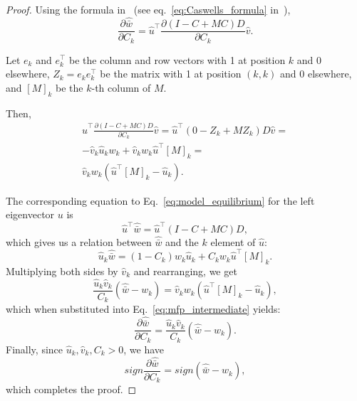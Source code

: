 \documentclass[12pt, twocolumn]{extarticle}
\newcommand*{\tr}{^\intercal}
\begin{document}
\begin{proof}
Using the formula in~\citet{Caswell1978} (see eq.~\ref{eq:Caswells_formula} in~),
\begin{equation}
\frac{\partial \hat{\bar w}}{\partial C_k} = 
\hat u\tr \frac{\partial (I-C+MC)D}{\partial C_k} \hat v.
\end{equation}

Let $e_k$ and $e\tr_k$ be the column and row vectors with 1 at position $k$ and 0 elsewhere, $Z_k = e_k e\tr_k$ be the matrix with 1 at position $(k,k)$ and 0 elsewhere, and $[M]_k$ be the $k$-th column of $M$.

Then,
\begin{multline}\label{eq:mfp_intermediate}
\hat u\tr \frac{\partial (I-C+MC)D}{\partial C_k} \hat v = 
\hat u\tr (0 - Z_k + M Z_k)D \hat v = \\
-\hat v_k \hat u_k w_k + \hat v_k w_k \hat u\tr[M]_k = \\
\hat v_k w_k (\hat u\tr[M]_k - \hat u_k). 
\end{multline}

The corresponding equation to Eq.~\ref{eq:model_equilibrium} for the left
eigenvector $u$ is 
\begin{equation}
\hat u\tr \hat{\bar w} = \hat u\tr (I - C + MC) D,
\end{equation}
which gives us a relation between $\hat{\bar w}$ and the $k$
element of $\hat u$:
\begin{equation}
\hat u_k \hat{\bar w} = (1-C_k) w_k \hat u_k + C_k w_k \hat u\tr [M]_k.
\end{equation}
Multiplying both sides by $\hat v_k$  and rearranging, we get 
\begin{equation}
\frac{\hat u_k \hat v_k}{C_k} (\hat{\bar w} - w_k) = \hat v_k w_k (\hat u\tr [M]_k - \hat u_k),
\end{equation}
which when substituted into Eq.~\ref{eq:mfp_intermediate} yields:
\begin{equation}
\frac{\partial \hat{\bar w}}{\partial C_k} = 
\frac{\hat u_k \hat v_k}{C_k} (\hat{\bar w} - w_k).
\end{equation}
Finally, since $\hat u_k, \hat v_k, C_k > 0$, we have
\begin{equation}
sign \frac{\partial \hat{\bar w}}{\partial C_k} = 
sign (\hat{\bar w} - w_k),
\end{equation}
which completes the proof.
\end{proof}
\end{document}
